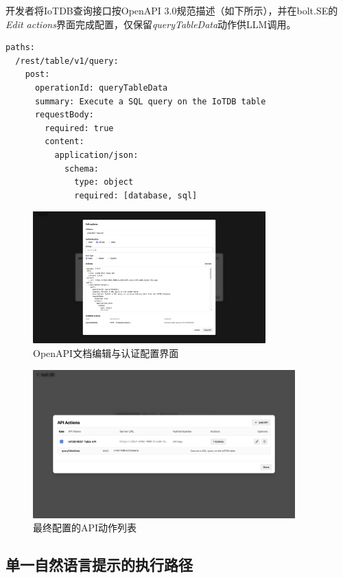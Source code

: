 开发者将IoTDB查询接口按OpenAPI 3.0规范描述（如下所示），并在bolt.SE的\textit{Edit actions}界面完成配置，仅保留\textit{queryTableData}动作供LLM调用。

\begin{verbatim}
paths:
  /rest/table/v1/query:
    post:
      operationId: queryTableData
      summary: Execute a SQL query on the IoTDB table
      requestBody:
        required: true
        content:
          application/json:
            schema:
              type: object
              required: [database, sql]
\end{verbatim}

\begin{figure}[htbp]
  \centering
  \includegraphics[width=0.8\textwidth]{figures/screenshots/iotdb-demo/openapi-editor.png}
  \caption{OpenAPI文档编辑与认证配置界面}
  \label{fig:openapi-editor}
\end{figure}

\clearpage

\begin{figure}[t]
  \centering
  \includegraphics[width=0.9\textwidth]{figures/screenshots/iotdb-demo/api-actions.png}
  \caption{最终配置的API动作列表}
  \label{fig:api-actions}
\end{figure}

\subsection{单一自然语言提示的执行路径}

